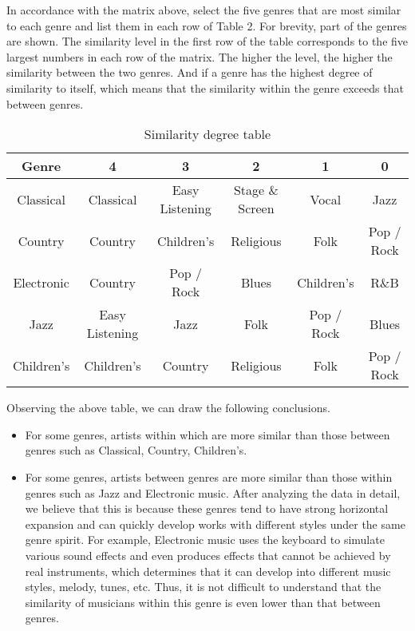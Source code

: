 \documentclass{mcmthesis}
\begin{document}
 In accordance with the matrix above, select the five genres that are most similar to each genre and list them in each row of Table 2. For brevity, part of the genres are shown. The similarity level in the first row of the table corresponds to the five largest numbers in each row of the matrix. The higher the level, the higher the similarity between the two genres. And if a genre has the highest degree of similarity to itself, which means that the similarity within the genre exceeds that between genres. 
\begin{table}[H]
	\centering  
	\caption{Similarity degree table}
	
	\label{table_time}
	
	\begin{tabular}{cccccc}  
		
		\toprule   
		
		Genre&4 &3&2&1&0\\ 
		
		\midrule   
		Classical&Classical&Easy Listening&Stage $\&$ Screen&Vocal&Jazz \\ 
		Country&Country&Children's &Religious&Folk&Pop $/$ Rock
		\\  
		Electronic & Country&Pop $/$ Rock & Blues&Children's&R$\&$B
		\\    
		Jazz &Easy Listening&Jazz& Folk&Pop $/$ Rock&Blues
		\\
		Children's&Children's&Country&Religious&Folk&Pop $/$ Rock
		\\
		\bottomrule  
		
	\end{tabular}
\end{table}
Observing the above table, we can draw the following conclusions.
\begin{itemize}
	\item For some genres, artists within which are more similar than those between genres such as Classical, Country, Children's.
	\item For some genres, artists between genres are more similar than those within genres such as Jazz and Electronic music. After analyzing the data in detail, we believe that this is because these genres tend to have strong horizontal expansion and can quickly develop works with different styles under the same genre spirit. For example, Electronic music uses the keyboard to simulate various sound effects and even produces effects that cannot be achieved by real instruments, which determines that it can develop into different music styles, melody, tunes, etc. Thus, it is not difficult to understand that the similarity of musicians within this genre is even lower than that between genres.
\end{itemize}
\end{document}
